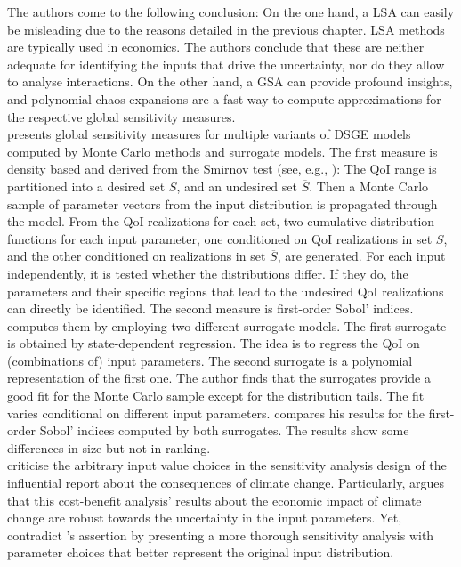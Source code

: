 The authors come to the following conclusion: On the one hand, a LSA can easily be misleading due to the reasons detailed in the previous chapter. LSA methods are typically used in economics. The authors conclude that these are neither adequate for identifying the inputs that drive the uncertainty, nor do they allow to analyse interactions. On the other hand, a GSA can provide profound insights, and polynomial chaos expansions are a fast way to compute approximations for the respective global sensitivity measures.\\
\newline
\cite{Ratto.2008} presents global sensitivity measures for multiple variants of DSGE models computed by Monte Carlo methods and surrogate models. The first measure is density based and derived from the Smirnov test (see, e.g., \cite{Hornberger.1981}): The QoI range is partitioned into a desired set $S$, and an undesired set $\overline{S}$. Then a Monte Carlo sample of parameter vectors from the input distribution is propagated through the model. From the QoI realizations for each set, two cumulative distribution functions for each input parameter, one conditioned on QoI realizations in set $S$, and the other conditioned on realizations in set $\overline{S}$, are generated. For each input independently, it is tested whether the distributions differ. If they do, the parameters and their specific regions that lead to the undesired QoI realizations can directly be identified. The second measure is first-order Sobol' indices. \citeauthor{Ratto.2008} computes them by employing two different surrogate models. The first surrogate is obtained by state-dependent regression. The idea is to regress the QoI on (combinations of) input parameters. The second surrogate is a polynomial representation of the first one. The author finds that the surrogates provide a good fit for the Monte Carlo sample except for the distribution tails. The fit varies conditional on different input parameters. \citeauthor{Ratto.2008} compares his results for the first-order Sobol' indices computed by both surrogates. The results show some differences in size but not in ranking.\\
\newline
\cite{Saltelli.2010} criticise the arbitrary input value choices in the sensitivity analysis design of the influential \cite{Stern.2007} report about the consequences of climate change. Particularly, \citeauthor{Stern.2007} argues that this cost-benefit analysis' results about the economic impact of climate change are robust towards the uncertainty in the input parameters. Yet, \cite{Saltelli.2010} contradict \citeauthor{Stern.2007}'s assertion by presenting a more thorough sensitivity analysis with parameter choices that better represent the original input distribution.\\
